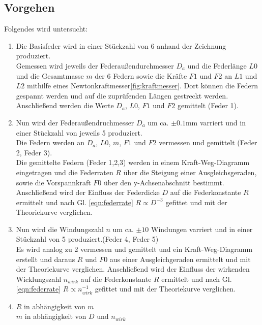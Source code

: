 \subsection{Vorgehen}
Folgendes wird untersucht:
\begin{enumerate}
    \item   Die Basisfeder wird in einer Stückzahl von 6 anhand der Zeichnung produziert.\\
            Gemessen wird jeweils der Federaußendurchmesser $D_a$ und die Federlänge 
            $L0$ und die Gesamtmasse $m$ der 6 Federn sowie die Kräfte $F1$ und $F2$ an $L1$ und $L2$ mithilfe eines Newtonkraftmesser\ref{fig:kraftmesser}.
            Dort können die Federn gespannt werden und auf die zuprüfenden Längen gestreckt werden.\\
            Anschließend werden die Werte $D_a$, $L0$, $F1$ und $F2$ gemittelt (Feder 1).

    \item   Nun wird der Federaußendruchmesser $D_a$ um ca. $\pm0.1$mm varriert und in einer 
            Stückzahl von jeweils 5 produziert.\\
            Die Federn werden an $D_a$, $L0$, $m$, $F1$ und $F2$ vermessen und gemittelt (Feder 2, Feder 3).\\
            Die gemittelte Federn (Feder 1,2,3) werden in einem Kraft-Weg-Diagramm eingetragen und
            die Federraten $R$ über die Steigung einer Ausgleichsgeraden, sowie die Vorspannkraft $F0$ 
            über den y-Achsenabschnitt bestimmt.\\
            Anschließend wird der Einfluss der Federdicke $D$ auf die Federkonstante $R$ ermittelt
            und nach Gl. \ref{eqn:federrate} $R \propto D^{-3}$ gefittet und mit der Theoriekurve verglichen.

    \item   Nun wird die Windungszahl $n$ um ca. $\pm 10$ Windungen varriert und in einer Stückzahl von 5 produziert.(Feder 4, Feder 5)\\
            Es wird analog zu 2 vermessen und gemittelt und ein Kraft-Weg-Diagramm erstellt und
            daraus $R$ und $F0$ aus einer Ausgleichgeraden ermittelt und mit der Theoriekurve verglichen.
            Anschließend wird der Einfluss der wirkenden Wicklungszahl $n_{wirk}$ auf die Federkonstante $R$ ermittelt
            und nach Gl. \ref{eqn:federrate} $R \propto n_{wirk}^{-1}$ gefittet und mit der Theoriekurve verglichen.

    \item   $R$ in abhängigkeit von $m$\\
            $m$ in abhängigkeit von $D$ und $n_{wirk}$  
\end{enumerate}
 